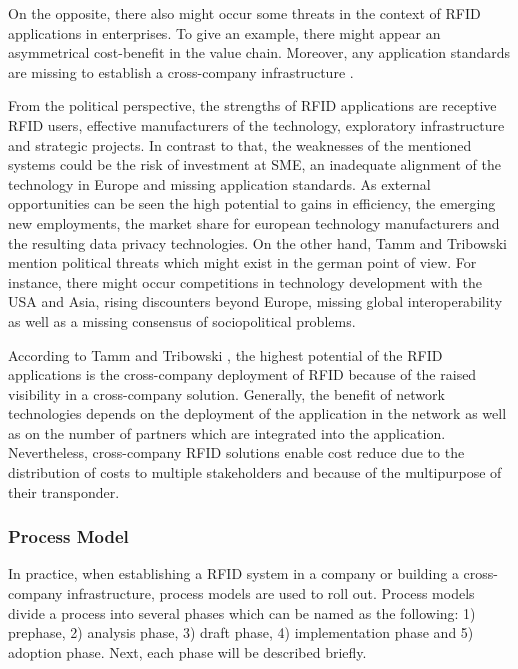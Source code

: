 On the opposite, there also might occur some threats in the context of RFID applications in enterprises. To give an example, there might appear an asymmetrical cost-benefit in the value chain. Moreover, any application standards are missing to establish a cross-company infrastructure \cite[p.47 ff.]{fokus}.

From the political perspective, the strengths of RFID applications are receptive RFID users, effective manufacturers of the technology, exploratory infrastructure and strategic projects. In contrast to that, the weaknesses of the mentioned systems could be the risk of investment at \ac{SME}, an inadequate alignment of the technology in Europe and missing application standards. As external opportunities can be seen the high potential to gains in efficiency, the emerging new employments, the market share for european technology manufacturers and the resulting data privacy technologies. On the other hand,  Tamm and Tribowski \cite[p.47 ff.]{fokus} mention political threats which might exist in the german point of view. For instance, there might occur competitions in technology development with the USA and Asia, rising discounters beyond Europe, missing global interoperability as well as a missing consensus of sociopolitical problems. 

According to Tamm and Tribowski \cite[p.95 ff.]{fokus}, the highest potential of the RFID applications is the cross-company deployment of RFID because of the raised visibility in a cross-company solution. Generally, the benefit of network technologies depends on the deployment of the application in the network as well as on the number of partners which are integrated into the application. Nevertheless, cross-company RFID solutions enable cost reduce due to the distribution of costs to multiple stakeholders and because of the multipurpose of their transponder.

\subsubsection{Process Model}

In practice, when establishing a RFID system in a company or building a cross-company infrastructure, process models are used to roll out. Process models divide a process into several phases \cite[p.59 ff.]{fokus} which can be named as the following: 1) prephase, 2) analysis phase, 3) draft phase, 4) implementation phase and 5) adoption phase. Next, each phase will be described briefly.

